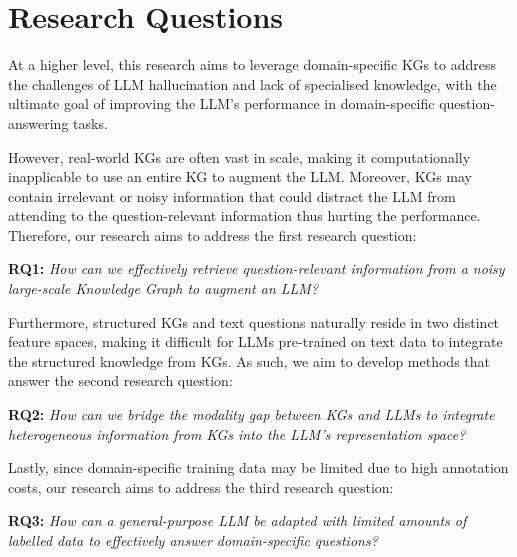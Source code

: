 \section*{Research Questions}

At a higher level, this research aims to leverage domain-specific KGs to address the challenges of LLM hallucination and lack of specialised knowledge, with the ultimate goal of improving the LLM's performance in domain-specific question-answering tasks.

However, real-world KGs are often vast in scale, making it computationally inapplicable to use an entire KG to augment the LLM. Moreover, KGs may contain irrelevant or noisy information that could distract the LLM from attending to the question-relevant information thus hurting the performance. Therefore, our research aims to address the first research question:

\textbf{RQ1:} \emph{How can we effectively retrieve question-relevant information from a noisy large-scale Knowledge Graph to augment an LLM?}

Furthermore, structured KGs and text questions naturally reside in two distinct feature spaces, making it difficult for LLMs pre-trained on text data to integrate the structured knowledge from KGs. As such, we aim to develop methods that answer the second research question:

\textbf{RQ2:} \emph{How can we bridge the modality gap between KGs and LLMs to integrate heterogeneous information from KGs into the LLM's representation space?}

Lastly, since domain-specific training data may be limited due to high annotation costs, our research aims to address the third research question:

\textbf{RQ3:} \emph{How can a general-purpose LLM be adapted with limited amounts of labelled data to effectively answer domain-specific questions?}

